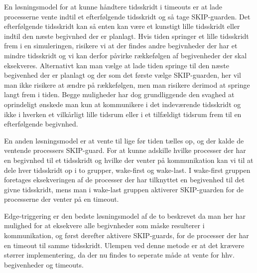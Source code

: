 En løsningsmodel for at kunne håndtere tidsskridt i timeouts er at lade processerne vente indtil et efterfølgende tidsskridt og så tage SKIP-guarden. Det efterfølgende  tidsskridt kan så  enten kan være et kunstigt lille tidsskridt eller indtil den næste begivnhed der er planlagt.
Hvis tiden springer et lille  tidsskridt frem  i en simuleringen, risikere vi at der findes andre begivnheder der har et mindre tidsskridt og vi  kan derfor  påvirke rækkefølgen af begivenheder der skal eksekveres. 
Alternativt kan man vælge at lade tiden springe til den næste begivenhed der er planlagt og der som det første vælge SKIP-guarden, her vil man ikke risikere at ændre på rækkefølgen, men man risikere derimod at springe langt frem i tiden.
Begge muligheder har dog grundliggende den svaghed at oprindeligt ønskede man kun at kommunikere i det indeværende tidsskridt og ikke i hverken et vilkårligt lille tidsrum eller i et tilfældigt tidsrum frem til en efterfølgende begivnhed.

En anden løsningsmodel er at vente til lige før tiden tælles op, og der kalde de ventende processers SKIP-guard. 
For at kunne adskille hvilke processer der har en begivnhed til et tidsskridt og hvilke der venter på kommunikation kan vi  til at dele hver tidsskridt op i to grupper, wake-first og wake-last.
I wake-first gruppen foretages eksekveringen af de processer der har tilknyttet en begivenhed til det givne tidsskridt, mens man i  wake-last gruppen aktiverer SKIP-guarden for de processerne der venter på en timeout.

Edge-triggering er den bedste løsningsmodel af de to beskrevet da man her har mulighed for at eksekvere alle begivnheder som måske resulterer i kommunikation, og først derefter aktivere SKIP-guards, for de processer der har en timeout til samme tidsskridt. Ulempen ved denne metode er at det krævere størrer implementering, da der nu findes to seperate måde at vente for hhv. begivenheder og timeouts.

